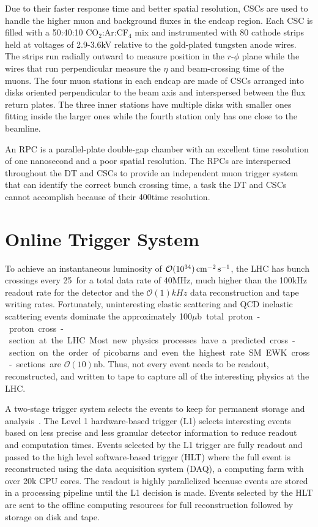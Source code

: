 Due to their faster response time and better spatial resolution, CSCs are used to handle the higher muon and background fluxes in the endcap region. 
Each CSC is filled with a 50:40:10 CO$_2$:Ar:CF$_4$ mix and instrumented with 80 cathode strips held at voltages of 2.9-3.6\unit{kV} relative to the gold-plated tungsten anode wires.
The strips run radially outward to measure position in the $r$-$\phi$ plane while the wires that run perpendicular measure the $\eta$ and beam-crossing time of the muons.
The four muon stations in each endcap are made of CSCs arranged into disks oriented perpendicular to the beam axis and interspersed between the flux return plates.
The three inner stations have multiple disks with smaller ones fitting inside the larger ones while the fourth station only has one close to the beamline.

An RPC is a parallel-plate double-gap chamber with an excellent time resolution of one nanosecond and a poor spatial resolution. 
The RPCs are interspersed throughout the DT and CSCs to provide an independent muon trigger system that can identify the correct bunch crossing time, a task the DT and CSCs cannot accomplish because of their 400\ns time resolution.

\section{Online Trigger System}

To achieve an instantaneous luminosity of $\mathcal{O}(10^{34}) \,\text{cm}^{-2}\,\text{s}^{-1}$, the LHC has bunch crossings every 25\ns\ for a total data rate of 40\unit{MHz}, much higher than the 100\unit{kHz} readout rate for the detector and the $\mathcal{O}(1)\unit{kHz}$ data reconstruction and tape writing rates.
Fortunately, uninteresting elastic scattering and QCD inelastic scattering events dominate the approximately 100\unit{$\mu$b} total proton-proton cross-section at the LHC.
Most new physics processes have a predicted cross-section on the order of picobarns and even the highest rate SM EWK cross-sections are $\mathcal{O}(10)$\unit{nb}.
Thus, not every event needs to be readout, reconstructed, and written to tape to capture all of the interesting physics at the LHC.

A two-stage trigger system selects the events to keep for permanent storage and analysis~\cite{CMS2008}.
The Level 1 hardware-based trigger (L1) selects interesting events based on less precise and less granular detector information to reduce readout and computation times.
Events selected by the L1 trigger are fully readout and passed to the high level software-based trigger (HLT) where the full event is reconstructed using the data acquisition system (DAQ), a computing farm with over 20k CPU cores.
The readout is highly parallelized because events are stored in a processing pipeline until the L1 decision is made.
Events selected by the HLT are sent to the offline computing resources for full reconstruction followed by storage on disk and tape. 

